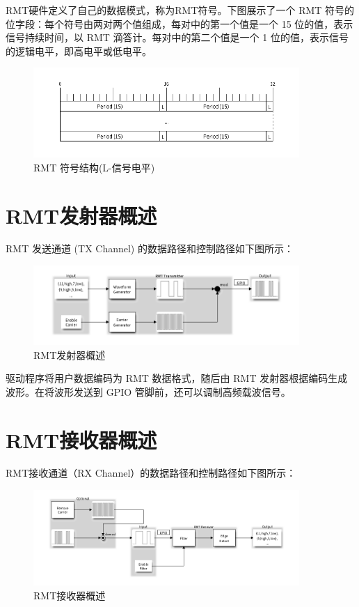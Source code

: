 \documentclass[lang=cn,newtx,10pt,scheme=chinese]{elegantbook}
\begin{document}
RMT硬件定义了自己的数据模式，称为RMT符号。下图展示了一个 RMT 符号的位字段：每个符号由两对两个值组成，每对中的第一个值是一个 15 位的值，表示信号持续时间，以 RMT 滴答计。每对中的第二个值是一个 1 位的值，表示信号的逻辑电平，即高电平或低电平。

\begin{figure}[!htb]
\centering
\includegraphics[width=0.9\textwidth]{RMT-1.png}
\caption{RMT 符号结构(L-信号电平)}
\end{figure}

\section{RMT发射器概述}

RMT 发送通道 (TX Channel) 的数据路径和控制路径如下图所示：

\begin{figure}[!htb]
\centering
\includegraphics[width=0.9\textwidth]{RMT-2.png}
\caption{RMT发射器概述}
\end{figure}

驱动程序将用户数据编码为 RMT 数据格式，随后由 RMT 发射器根据编码生成波形。在将波形发送到 GPIO 管脚前，还可以调制高频载波信号。

\section{RMT接收器概述}

RMT接收通道（RX Channel）的数据路径和控制路径如下图所示：

\begin{figure}[!htb]
\centering
\includegraphics[width=0.9\textwidth]{RMT-3.png}
\caption{RMT接收器概述}
\end{figure}
\end{document}
